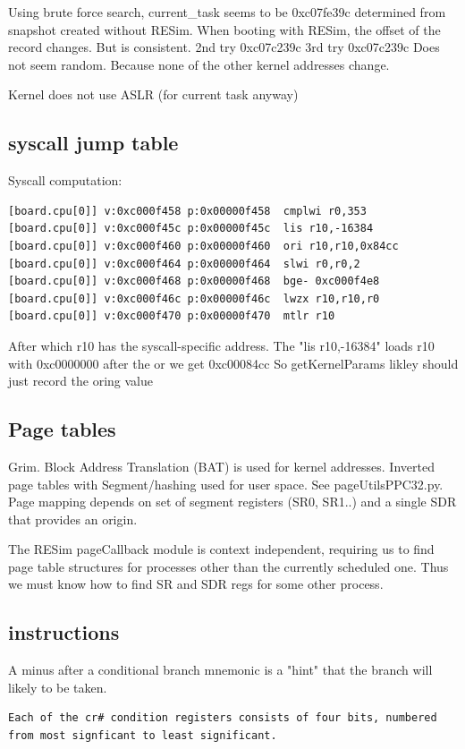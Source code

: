 \documentclass[titlepage]{article}
\begin{document}
\begin{appendices}
Using brute force search, current\_task seems to be 0xc07fe39c
determined from snapshot created without RESim.
When booting with RESim, the offset of the record changes.
But is consistent.
2nd try                                             0xc07c239c
3rd try                                             0xc07c239c
Does not seem random.  Because none of the other kernel addresses change.

Kernel does not use ASLR (for current task anyway)

\subsection{syscall jump table}
Syscall computation:
\begin{verbatim}
[board.cpu[0]] v:0xc000f458 p:0x00000f458  cmplwi r0,353
[board.cpu[0]] v:0xc000f45c p:0x00000f45c  lis r10,-16384
[board.cpu[0]] v:0xc000f460 p:0x00000f460  ori r10,r10,0x84cc
[board.cpu[0]] v:0xc000f464 p:0x00000f464  slwi r0,r0,2
[board.cpu[0]] v:0xc000f468 p:0x00000f468  bge- 0xc000f4e8
[board.cpu[0]] v:0xc000f46c p:0x00000f46c  lwzx r10,r10,r0
[board.cpu[0]] v:0xc000f470 p:0x00000f470  mtlr r10
\end{verbatim}
After which r10 has the syscall-specific address.
The "lis r10,-16384" loads r10 with 0xc0000000
after the or we get 0xc00084cc
So getKernelParams likley should just record the oring value


\subsection{Page tables}
Grim.  
Block Address Translation (BAT) is used for kernel addresses.
Inverted page tables with Segment/hashing used for user space.  See pageUtilsPPC32.py.
Page mapping depends on set of segment registers (SR0, SR1..) and a single SDR that provides an origin.

The RESim pageCallback module is context independent, requiring us to find page table structures for
processes other than the currently scheduled one.  Thus we must know how to find SR and SDR regs for
some other process.

\subsection{instructions}
A minus after a conditional branch mnemonic is a "hint" that the branch will likely to be taken.
\begin{verbatim}
Each of the cr# condition registers consists of four bits, numbered from most signficant to least significant.


\end{verbatim}
\end{appendices}
\end{document}
